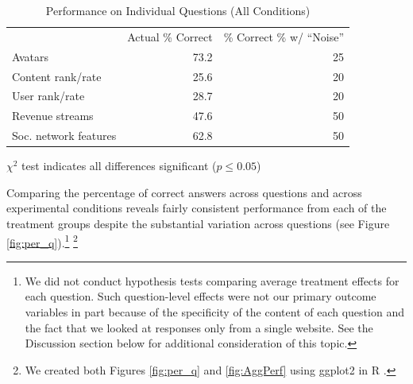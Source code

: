 \documentclass{chi2009}
\begin{document}
\begin{table}[ht]					%
\begin{center}						%
\caption{Performance on Individual Questions (All Conditions)} %
\vspace{8pt}
\begin{threeparttable}
\begin{tabular}{@{}l r r@{}}
\toprule
& Actual \% Correct & \% Correct \% w/ ``Noise'' \\
\cmidrule(l){2-3}
Avatars & 73.2 & 25\\ 
Content rank/rate & 25.6 & 20\\
User rank/rate & 28.7 & 20\\
Revenue streams & 47.6 & 50\\
Soc. network features & 62.8 & 50\\
\bottomrule
\end{tabular}
  \begin{tablenotes}[para]
     \small{\item $\chi^{2}$ test indicates all differences significant ($p \leq 0.05$)}
  \end{tablenotes}
\end{threeparttable}
\label{table:ind_q_results}
\end{center}
\end{table}

Comparing the percentage of correct answers across questions and
across experimental conditions reveals fairly consistent performance
from each of the treatment groups despite the substantial variation
across questions (see Figure \ref{fig:per_q}).\footnote{We did not
  conduct hypothesis tests comparing average treatment effects for
  each question. Such question-level effects were not our primary
  outcome variables in part because of the specificity of the content
  of each question and the fact that we looked at responses only from
  a single website. See the Discussion section below for additional
  consideration of this topic.} \footnote{We created both Figures
  \ref{fig:per_q} and \ref{fig:AggPerf} using ggplot2 in R
  \cite{wickham2008ggplot2}.}
\end{document}
